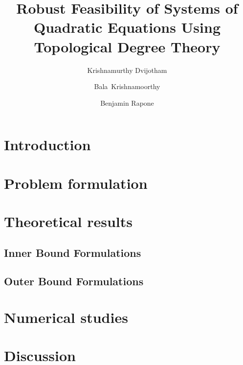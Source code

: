 \documentclass[11pt]{article}
\title{Robust Feasibility of Systems of Quadratic Equations Using Topological Degree Theory}
\author[*]{Krishnamurthy Dvijotham}
\author[**]{Bala~Krishnamoorthy}
\author[**]{Benjamin Rapone}
\affil[*]{Google DeepMind}
\affil[**]{Wahington State University}
\theoremstyle{plain}
\theoremstyle{definition}
\theoremstyle{remark}
\begin{document}
\maketitle



\section{Introduction}
  


\section{Problem formulation}



\section{Theoretical results}



\subsection{Inner Bound Formulations}



\subsection{Outer Bound Formulations}



\section{Numerical studies}



\section{Discussion}




\end{document}
